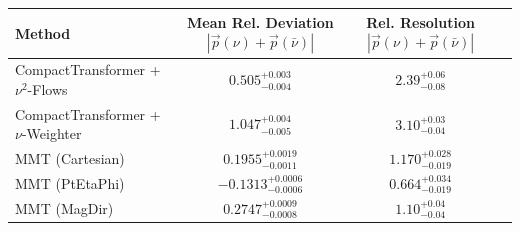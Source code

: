     \begin{tabular}{lccc}
        \toprule
        Method & Mean Rel. Deviation $|\vec{p}(\nu) + \vec{p}(\bar{\nu})|$ & Rel. Resolution $|\vec{p}(\nu) + \vec{p}(\bar{\nu})|$ \\
        \midrule
        CompactTransformer + $\nu^2$-Flows & $0.505^{+0.003}_{-0.004}$ & $2.39^{+0.06}_{-0.08}$ \\
        CompactTransformer + $\nu$-Weighter & $1.047^{+0.004}_{-0.005}$ & $3.10^{+0.03}_{-0.04}$ \\
        MMT (Cartesian) & $0.1955^{+0.0019}_{-0.0011}$ & $1.170^{+0.028}_{-0.019}$ \\
        MMT (PtEtaPhi) & $-0.1313^{+0.0006}_{-0.0006}$ & $0.664^{+0.034}_{-0.019}$ \\
        MMT (MagDir) & $0.2747^{+0.0009}_{-0.0008}$ & $1.10^{+0.04}_{-0.04}$ \\
        \bottomrule
    \end{tabular}